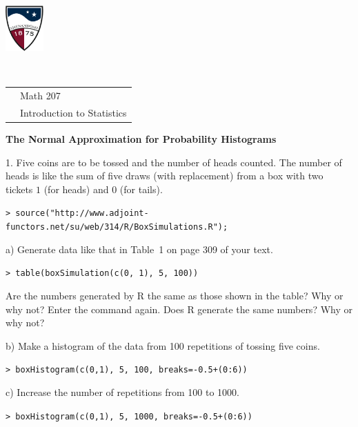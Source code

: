 \documentclass[10pt]{article}
\begin{document}
\pagestyle{empty}
\lstset{language=R, showspaces=false, showstringspaces=false}

\href{http://www.su.edu}{\includegraphics[height=1.75cm]{sulogo.eps}}
\vspace{-1.79cm}

{{\ }\hfill\small
\begin{tabular}{cl}
& Math 207\\
& Introduction to Statistics\\
\end{tabular}
}
\setlength{\baselineskip}{1.05\baselineskip}
\medskip

\begin{center}
\textbf{\large   The Normal Approximation for Probability Histograms}
\end{center}
\smallskip

\newcommand{\HH}{\hspace{20pt}\hphantom{a) } }

1. Five coins are to be tossed and the number of heads counted.  
The number of heads is like 
the sum of five draws (with replacement) from a box with two tickets $1$ 
(for heads) and $0$
(for tails).

\HH \lstinline!> source("http://www.adjoint-functors.net/su/web/314/R/BoxSimulations.R");!

\hspace{20pt} a) Generate data like that in Table~1 on page 309 of your text.

\HH \lstinline!> table(boxSimulation(c(0, 1), 5, 100))!

Are the numbers generated by R the same as those shown in the table?  Why or why not?
Enter the command again.  Does R generate the same numbers? Why or why not?

\hspace{20pt} b) Make a histogram of the data from 100 repetitions of tossing five coins.

\HH \lstinline!> boxHistogram(c(0,1), 5, 100, breaks=-0.5+(0:6))!

\hspace{20pt} c) Increase the number of repetitions from 100 to 1000.  

\HH \lstinline!> boxHistogram(c(0,1), 5, 1000, breaks=-0.5+(0:6))!
\end{document}
